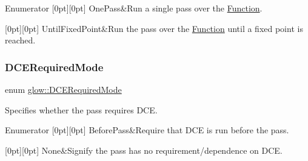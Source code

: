 \begin{DoxyEnumFields}{Enumerator}
[0pt][0pt]{}\mbox{\label{namespaceglow_a56845b9c860fa69d01d2084361d7c1f0accd4cef52fe08da3eeac0e4396a2aca2}} 
One\+Pass&Run a single pass over the \hyperlink{classglow_1_1_function}{Function}. \\
\hline

[0pt][0pt]{}\mbox{\label{namespaceglow_a56845b9c860fa69d01d2084361d7c1f0a1a3fe1603e0a452b098a101b7d833f87}} 
Until\+Fixed\+Point&Run the pass over the \hyperlink{classglow_1_1_function}{Function} until a fixed point is reached. \\
\hline

\end{DoxyEnumFields}
\mbox{\label{namespaceglow_a6b85539f22b3e3292adf202254f0da1e}} 
\subsubsection{\texorpdfstring{D\+C\+E\+Required\+Mode}{DCERequiredMode}}
{\footnotesize\ttfamily enum \hyperlink{namespaceglow_a6b85539f22b3e3292adf202254f0da1e}{glow\+::\+D\+C\+E\+Required\+Mode}\hspace{0.3cm}{\ttfamily [strong]}}



Specifies whether the pass requires D\+CE. 

\begin{DoxyEnumFields}{Enumerator}
[0pt][0pt]{}\mbox{\label{namespaceglow_a6b85539f22b3e3292adf202254f0da1eaff7ad7af6ac42e36a5d538e74cde072d}} 
Before\+Pass&Require that D\+CE is run before the pass. \\
\hline

[0pt][0pt]{}\mbox{\label{namespaceglow_a6b85539f22b3e3292adf202254f0da1ea6adf97f83acf6453d4a6a4b1070f3754}} 
None&Signify the pass has no requirement/dependence on D\+CE. \\
\hline

\end{DoxyEnumFields}
\mbox{\label{namespaceglow_ab92e14a94329daf4083db670e95fbcdf}} 
